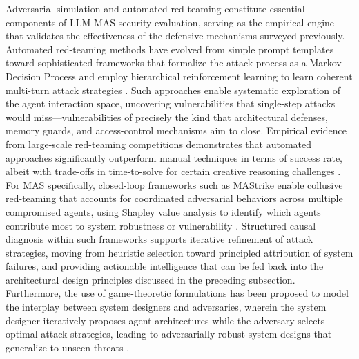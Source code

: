 \documentclass[11pt]{article}
\begin{document}
Adversarial simulation and automated red-teaming constitute essential components of LLM-MAS security evaluation, serving as the empirical engine that validates the effectiveness of the defensive mechanisms surveyed previously. Automated red-teaming methods have evolved from simple prompt templates toward sophisticated frameworks that formalize the attack process as a Markov Decision Process and employ hierarchical reinforcement learning to learn coherent multi-turn attack strategies \cite{ref451}. Such approaches enable systematic exploration of the agent interaction space, uncovering vulnerabilities that single-step attacks would miss---vulnerabilities of precisely the kind that architectural defenses, memory guards, and access-control mechanisms aim to close. Empirical evidence from large-scale red-teaming competitions demonstrates that automated approaches significantly outperform manual techniques in terms of success rate, albeit with trade-offs in time-to-solve for certain creative reasoning challenges \cite{ref452}. For MAS specifically, closed-loop frameworks such as MAStrike enable collusive red-teaming that accounts for coordinated adversarial behaviors across multiple compromised agents, using Shapley value analysis to identify which agents contribute most to system robustness or vulnerability \cite{ref438}. Structured causal diagnosis within such frameworks supports iterative refinement of attack strategies, moving from heuristic selection toward principled attribution of system failures, and providing actionable intelligence that can be fed back into the architectural design principles discussed in the preceding subsection. Furthermore, the use of game-theoretic formulations has been proposed to model the interplay between system designers and adversaries, wherein the system designer iteratively proposes agent architectures while the adversary selects optimal attack strategies, leading to adversarially robust system designs that generalize to unseen threats \cite{ref453}.
\end{document}
